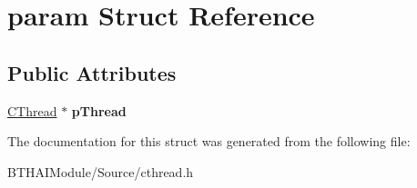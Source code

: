 \hypertarget{structparam}{\section{param Struct Reference}
\label{structparam}
}
\subsection*{Public Attributes}
\begin{DoxyCompactItemize}
\item 
\hypertarget{structparam_a79ca6122ebbd75296a1ccf0f1b35356d}{\hyperlink{class_c_thread}{C\-Thread} $\ast$ {\bfseries p\-Thread}}\label{structparam_a79ca6122ebbd75296a1ccf0f1b35356d}

\end{DoxyCompactItemize}


The documentation for this struct was generated from the following file\-:\begin{DoxyCompactItemize}
\item 
B\-T\-H\-A\-I\-Module/\-Source/cthread.\-h\end{DoxyCompactItemize}
